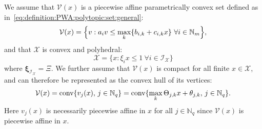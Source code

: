 \documentclass[journal]{IEEEtran}
\newcommand{\todo}[2]{%
  \providetoggle{#1}%
    \iftoggle{#1}{%
    {\color{red}#2}%
    }{#2}
}
\providecommand{\conv}{\text{conv}}
\theoremstyle{remark}
\theoremstyle{definition}
\begin{document}

We assume that $\mathcal V(x)$ is a piecewise affine parametrically convex 
set defined as in~\eqref{eq:definition:PWA:polytopic:set:general}:
\begin{equation}\label{eq:definition:PWA:polytopic:set:cl}
\mathcal{V}(x) = \Bigl\{ v : a_i v \leq\max_{k} \{ b_{i,k} + c_{i,k} x\} \ \forall i \in\mathbb N_m\Bigr\} ,
\end{equation}
%
and that $\mathcal{X}$ is convex and polyhedral:
\begin{equation}\label{eq:definition:polytopic:X}
\mathcal{X}=\{x : \xi_i x \leq 1\ \forall i \in\mathcal{I}_{\mathcal{X}} \} 
\end{equation}
where $\boldsymbol{\xi}_{\mathcal{I}_{\mathcal{X}}}=\Xi$.
%
We further assume \todo{Manuel:wlog}{(without loss of generality)} that $\mathcal V(x)$ is compact for all finite $x\in\mathcal X$,
and can therefore be represented as the 
convex hull of its vertices: 
\begin{equation}\label{eq:definition:PWA:polytopic:set:vertices}
\mathcal V(x) = \conv\{v_j(x), \, j\in\mathbb{N}_q\} 
=  \conv\{\todo{Manuel:convHull}{\max_{k}}
\Theta_{j\todo{Manuel:convHull}{,k}} x + \theta_{j\todo{Manuel:convHull}{,k}},\, j\in\mathbb{N}_q\}.
\end{equation}
%
Here $v_j(x)$ is necessarily piecewise affine in $x$ for all $j\in\mathbb{N}_q$ since ${\mathcal{V}}(x)$ is piecewise affine in $x$.
%
\end{document}
